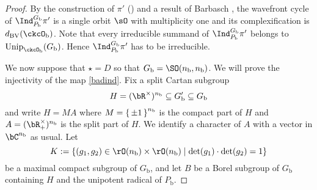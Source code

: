 \documentclass[12pt,a4paper]{amsart}
\newcommand{\trivial}[2][]{\if\relax\detokenize{#1}\relax
  {%
      \color{orange} \vspace{0em} $[$  #2 $]$
      \color{black}
  }
  \else
\ifx#1h
\ifcsname showtrivial\endcsname
{%
    \color{orange} \vspace{0em}  $[$ #2 $]$
    \color{black}
}
\fi
\else {\red Wrong argument!} \fi
\fi
}
\newcommand{\WF}{\mathrm{WF}}
\newcommand{\AV}{\mathrm{AV}}
\DeclareMathOperator{\Ann}{Ann}
\numberwithin{equation}{section}
\theoremstyle{remark}
\def\half{{\tfrac{1}{2}}}
\def\Unip{\mathrm{Unip}}
\def\dBV{d_{\mathrm{BV}}}
\def\lamck{\lambda_\ckcO}
\def\ckcOb{\ckcO_{\mathrm b}}
\def\nnb{n_{\mathrm b}}
\def\Gb{G_{\mathrm b}}
\def\Gpb{G'_{\mathrm b}}
\def\Pb{P_{\mathrm b}}
\newcommand{\Grt}{\cK}
\begin{document}
\begin{proof}

  By the construction of $\pi'$  () and
  a result of Barbasch \cite[Corollary 5.0.10]{B.Orbit}, the
  wavefront cycle of $\Ind_{\Pb}^{\Gb}\pi'$ is a single orbit $\sO$ with
  multiplicity one and its complexification is $\dBV(\ckcOb)$.
  Note that every irreducible summand of  $\Ind_{\Pb}^{\Gb}\pi'$ belongs
  to $\Unip_{\ckcOb}(\Gb)$. Hence $\Ind_{\Pb}^{\Gb}\pi'$ has to be irreducible.




  We now suppose that $\star=D$ so that $\Gb=\SO(\nnb, \nnb)$. We will prove the injectivity of the map \eqref{badind}.
    Fix a split Cartan subgroup
    $$H=(\bR^\times)^{\nnb}\subseteq \Gpb\subseteq \Gb $$ and write $H = MA$ where
    $M = \set{\pm 1}^{\nnb}$ is the compact part of $H$ and
    $A = (\bR^\times_+)^{\nnb}$ is the split part of $H$. We identify a
    character of $A$ with a vector in $\bC^{\nnb}$ as usual. Let
    \[
    K:=\{(g_1, g_2)\in \rO(\nnb)\times \rO(\nnb)\mid \det(g_1)\cdot \det(g_2)=1\}
    \]
    be a maximal compact subgroup of $\Gb$, and let 
    $B$ be a Borel subgroup of $\Gb$ containing $H$ and the unipotent radical of $\Pb$.


\end{proof}
\end{document}
